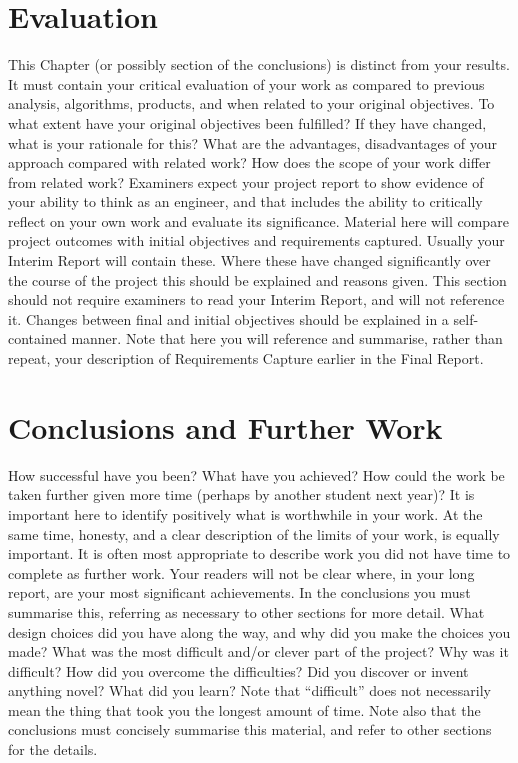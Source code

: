 \documentclass[10pt,onecolumn,letterpaper]{article}
\begin{document}

\section{Evaluation}
This Chapter (or possibly section of the conclusions) is
distinct from your results. It must contain your critical
evaluation of your work as compared to previous
analysis, algorithms, products, and when related to
your original objectives. To what extent have your
original objectives been fulfilled? If they have
changed, what is your rationale for this? What are the
advantages, disadvantages of your approach
compared with related work? How does the scope of
your work differ from related work? Examiners expect
your project report to show evidence of your ability to
think as an engineer, and that includes the ability to
critically reflect on your own work and evaluate its
significance.
Material here will compare project outcomes with
initial objectives and requirements captured. Usually
your Interim Report will contain these. Where these
have changed significantly over the course of the
project this should be explained and reasons given.
This section should not require examiners to read
your Interim Report, and will not reference it. Changes
between final and initial objectives should be
explained in a self-contained manner.
Note that here you will reference and summarise,
rather than repeat, your description of Requirements
Capture earlier in the Final Report.


\section{Conclusions and Further Work}

How successful have you been? What have you achieved? How could the work be taken further given more time (perhaps by another student next year)? It is important here to identify positively what is
worthwhile in your work. At the same time, honesty,
and a clear description of the limits of your work, is
equally important. It is often most appropriate to
describe work you did not have time to complete as
further work.
Your readers will not be clear where, in your long
report, are your most significant achievements. In the
conclusions you must summarise this, referring as
necessary to other sections for more detail.
What design choices did you have along the
way, and why did you make the choices you
made?
What was the most difficult and/or clever part
of the project?
Why was it difficult?
How did you overcome the difficulties?
Did you discover or invent anything novel?
What did you learn?
Note that “difficult” does not necessarily mean the
thing that took you the longest amount of time. Note
also that the conclusions must concisely summarise
this material, and refer to other sections for the
details.
\end{document}
